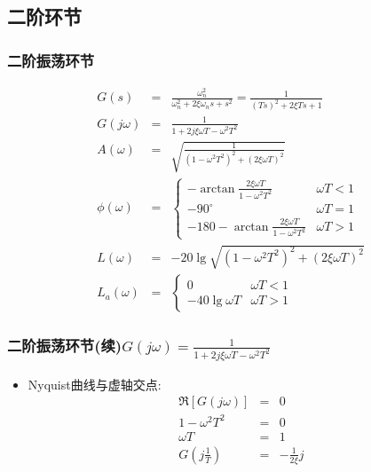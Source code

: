 \documentclass[table]{beamer}
\begin{document}
\subsection{二阶环节}
\label{sec-2-3}
\begin{frame}
\frametitle{二阶振荡环节}
\label{sec-2-3-1}

\begin{eqnarray*}
G(s) & = & \frac{\omega_n^2}{\omega_n^2 +2\xi\omega_n s + s^2}
       =   \frac{1}{(Ts)^2+2\xi Ts+1} \\
G(j\omega) & =& \frac{1}{1+2j\xi\omega T-\omega^2 T^2}\\
A(\omega) &=& \sqrt{\frac{1}{(1-\omega^2 T^2)^2+(2\xi\omega T)^2}}\\
\phi(\omega) &=& 
\begin{cases}
-\arctan\frac{2\xi\omega T}{1-\omega^2 T^2} & \omega T <1 \\
-90^{\circ} & \omega T =1 \\
-180-\arctan\frac{2\xi\omega T}{1-\omega^2 T^2} & \omega T >1 
\end{cases} \\
L(\omega)&=& -20\lg\sqrt{(1-\omega^2 T^2)^2+(2\xi\omega T)^2}\\
L_a(\omega)&=& 
\begin{cases} 0 & \omega T<1 \\ 
-40\lg\omega T & \omega T>1
\end{cases}
\end{eqnarray*}
\end{frame}
\begin{frame}
\frametitle{二阶振荡环节(续)$G(j\omega) = \frac{1}{1+2j\xi\omega T-\omega^2 T^2}$}
\label{sec-2-3-2}

\begin{itemize}
\item Nyquist曲线与虚轴交点:
      \begin{eqnarray*}
      \Re[G(j\omega)] &=& 0\\
      1-\omega^2 T^2 &=& 0\\
      \omega T &=&1\\
      G(j\frac{1}{T})&=&-\frac{1}{2\xi}j
      \end{eqnarray*}
\end{itemize}
\end{frame}
\end{document}
